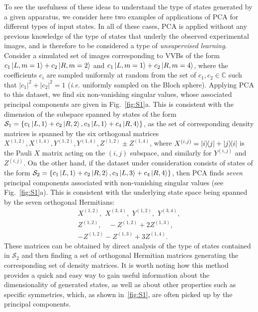 To see the usefulness of these ideas to understand the type of states generated by a given apparatus, we consider here two examples of applications of \ac{PCA} for different types of input states. 
In all of these cases, \ac{PCA} is applied without any previous knowledge of the type of states that underly the observed experimental images, and is therefore to be considered a type of \emph{unsupervised learning}.
Consider a simulated set of images corresponding to VVBs of the form
$c_1\ket{L,m=1}+c_2\ket{R,m=2}$ and
$c_1\ket{L,m=1}+c_2\ket{R,m=4}$, where the coefficients $c_i$ are sampled uniformly at random from the set of $c_{1},c_2\in\mathbb{C}$  such that $|c_1|^2+|c_2|^2=1$ (\emph{i.e.} uniformly sampled on the Bloch sphere).
Applying PCA to this dataset, we find six non-vanishing singular values, whose associated principal components are given in Fig.~\ref{fig:S1}a.
This is consistent with the dimension of the subspace  spanned by states of the form $\mathcal S_1=\{c_1\ket{L,1}+c_2\ket{R,2}, c_3\ket{L,1}+c_4\ket{R,4}\}$,  as the set of corresponding density matrices is spanned by the six orthogonal matrices
$X^{(1,2)}, X^{(1,4)}, Y^{(1,2)},Y^{(1,4)},Z^{(1,2)}\pm Z^{(1,4)}$, where $X^{(i,j)}=\ketbra{i}{j}+\ketbra{j}{i}$ is the Pauli $X$ matrix acting on the $(i,j)$ subspace, and similarly for $Y^{(i,j)}$ and $Z^{(i,j)}$.
On the other hand, if the dataset under consideration consists of states of the form $\mathcal S_2=\{c_1\ket{L,1}+c_2\ket{R,2}, c_3\ket{L,3}+c_4\ket{R,4}\}$, then \ac{PCA} finds \emph{seven} principal components associated with non-vanishing singular values (see Fig.~\ref{fig:S1}a).
This is consistent with the underlying state space being spanned by the seven orthogonal Hermitians:
\begin{equation}
\begin{gathered}
    X^{(1,2)}, \,\, X^{(3,4)}, \,\,
    Y^{(1,2)}, \,\, Y^{(3,4)}, \\
    Z^{(1,2)},\quad
    -Z^{(1,2)} + 2 Z^{(1,3)}, \\
    -Z^{(1,2)} - Z^{(1,3)} + 3 Z^{(1,4)}.
\end{gathered}
\end{equation}
These matrices can be obtained by direct analysis of the type of states contained in $\mathcal S_2$ and then finding a set of orthogonal Hermitian matrices generating the corresponding set of density matrices.
It is worth noting how this method provides a quick and easy way to gain useful information about the dimensionality of generated states, as well as about other properties such as specific symmetries, which, as shown in~\cref{fig:S1}, are often picked up by the principal components.


